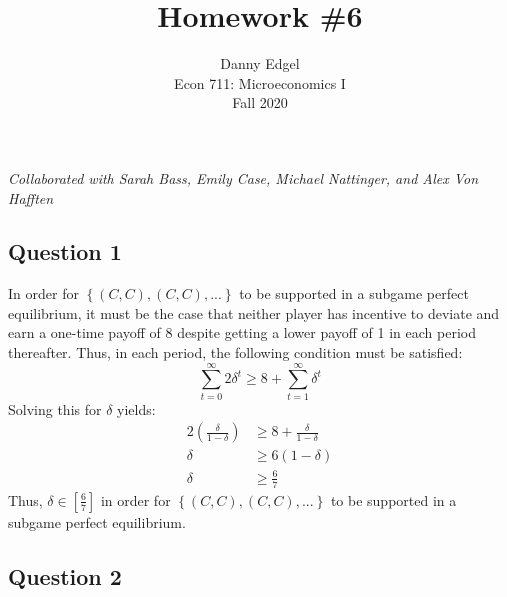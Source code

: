 \documentclass{article}
\begin{document}
\title{	Homework \#6 }
\author{ 	Danny Edgel 					\\ 
			Econ 711: Microeconomics I		\\
			Fall 2020						\\
		}
\maketitle\thispagestyle{empty}

\noindent\textit{Collaborated with Sarah Bass, Emily Case, Michael Nattinger, and Alex Von Hafften}


\subsection*{Question 1}
In order for ${\left\{(C,C),(C,C),...\right\}}$ to be supported in a subgame perfect equilibrium, it must be the case that neither player has incentive to deviate and earn a one-time payoff of 8 despite getting a lower payoff of 1 in each period thereafter. Thus, in each period, the following condition must be satisfied:
\[
	\sum_{t=0}^\infty 2\delta^t \geq 8 + \sum_{t=1}^\infty \delta^t
\]
Solving this for $\delta$ yields:
\begin{align*}
	2\left(\frac{\delta}{1-\delta}\right) &\geq 8 + \frac{\delta}{1-\delta}	\\
	\delta &\geq 6(1-\delta)	\\
	\delta &\geq \frac{6}{7}
\end{align*}	
Thus, ${\delta\in\left[\frac{6}{7}\right]}$ in order for ${\left\{(C,C),(C,C),...\right\}}$ to be supported in a subgame perfect equilibrium.



\subsection*{Question 2}
\end{document}

